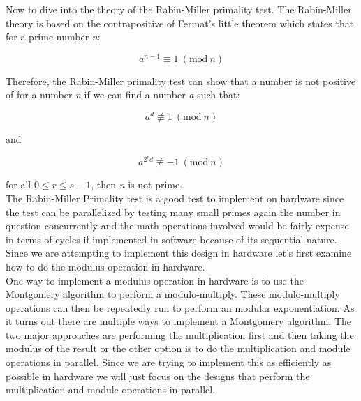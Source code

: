 \documentclass[journal]{IEEEtran}
\begin{document}
Now to dive into the theory of the Rabin-Miller primality test. The Rabin-Miller theory is based on the contrapositive of Fermat's little theorem which states that for a prime number \textit{n}:

	\begin{displaymath}
		a^{n-1} \equiv 1\ (\textrm{mod}\ n)
	\end{displaymath}

Therefore, the Rabin-Miller primality test can show that a number is not positive of for a number \textit{n} if we can find a number \textit{a} such that:

	\begin{displaymath}
		a^d \not \equiv 1\ (\textrm{mod}\ n)
	\end{displaymath}
		
and

	\begin{displaymath}
		a^{2^rd} \not \equiv -1\ (\textrm{mod}\ n) 
	\end{displaymath}

for all $0 \le r \le s-1$, then \textit{n} is not prime. \cite{wiki_miller-rabin} \\

The Rabin-Miller Primality test is a good test to implement on hardware since the test can be parallelized by testing many small primes again the number in question concurrently and the math operations involved would be fairly expense in terms of cycles if implemented in software because of its sequential nature. Since we are attempting to implement this design in hardware let's first examine how to do the modulus operation in hardware. \\

One way to implement a modulus operation in hardware is to use the Montgomery algorithm to perform a modulo-multiply. These modulo-multiply operations can then be repeatedly run to perform an modular exponentiation. As it turns out there are multiple ways to implement a Montgomery algorithm. The two major approaches are performing the multiplication first and then taking the modulus of the result or the other option is to do the multiplication and module operations in parallel. Since we are trying to implement this as efficiently as possible in hardware we will just focus on the designs that perform the multiplication and module operations in parallel.



\end{document}
